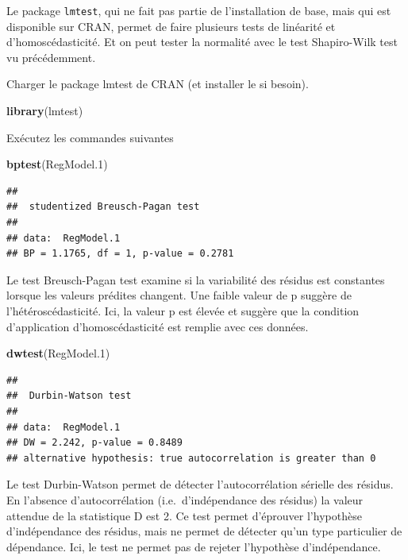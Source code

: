 \documentclass[12pt,]{book}
\makeatletter
\newenvironment{Shaded}{\begin{snugshade}}{\end{snugshade}}
\newcommand{\FloatTok}[1]{\textcolor[rgb]{0.00,0.00,0.81}{#1}}
\newcommand{\KeywordTok}[1]{\textcolor[rgb]{0.13,0.29,0.53}{\textbf{#1}}}
\newcommand{\NormalTok}[1]{#1}
\newenvironment{kframe}{%
\medskip{}
\setlength{\fboxsep}{.8em}
\def\at@end@of@kframe{}%
\ifinner\ifhmode%
 \def\at@end@of@kframe{\end{minipage}}%
 \begin{minipage}{\columnwidth}%
\fi\fi%
\def\FrameCommand##1{\hskip\@totalleftmargin \hskip-\fboxsep
\colorbox{incolor}{##1}\hskip-\fboxsep
    \hskip-\linewidth \hskip-\@totalleftmargin \hskip\columnwidth}%
\MakeFramed {\advance\hsize-\width
  \@totalleftmargin\z@ \linewidth\hsize
  \@setminipage}}%
{\par\unskip\endMakeFramed%
\at@end@of@kframe}
\newenvironment{rmdblock}[1]
 {
 \begin{itemize}
 \renewcommand{\labelitemi}{
   \raisebox{-.7\height}[0pt][0pt]{
     {\setkeys{Gin}{width=3em,keepaspectratio}\texttt{[image: images/\#1]}}
   }
 }
 \begin{kframe}
 \setlength{\fboxsep}{1em}
 \item
 }
 {
 \end{kframe}
 \end{itemize}
 }
\newenvironment{rmdcode}
  {\begin{rmdblock}{screen}}
  {\end{rmdblock}}
\makeatother
\begin{document}
Le package \texttt{lmtest}, qui ne fait pas partie de l'installation de base, mais qui est disponible sur CRAN, permet de faire plusieurs tests de linéarité et d'homoscédasticité. Et on peut tester la normalité avec le test Shapiro-Wilk test vu précédemment.

\begin{rmdcode}
Charger le package lmtest de CRAN (et installer le si besoin).
\end{rmdcode}

\begin{Shaded}
\begin{Highlighting}[]
\KeywordTok{library}\NormalTok{(lmtest)}
\end{Highlighting}
\end{Shaded}

\begin{rmdcode}
Exécutez les commandes suivantes
\end{rmdcode}

\begin{Shaded}
\begin{Highlighting}[]
\KeywordTok{bptest}\NormalTok{(RegModel}\FloatTok{.1}\NormalTok{)}
\end{Highlighting}
\end{Shaded}

\begin{verbatim}
## 
##  studentized Breusch-Pagan test
## 
## data:  RegModel.1
## BP = 1.1765, df = 1, p-value = 0.2781
\end{verbatim}

Le test Breusch-Pagan test examine si la variabilité des résidus est constantes lorsque les valeurs prédites changent. Une faible valeur de p suggère de l'hétéroscédasticité. Ici, la valeur p est élevée et suggère que la condition d'application d'homoscédasticité est remplie avec ces données.

\begin{Shaded}
\begin{Highlighting}[]
\KeywordTok{dwtest}\NormalTok{(RegModel}\FloatTok{.1}\NormalTok{)}
\end{Highlighting}
\end{Shaded}

\begin{verbatim}
## 
##  Durbin-Watson test
## 
## data:  RegModel.1
## DW = 2.242, p-value = 0.8489
## alternative hypothesis: true autocorrelation is greater than 0
\end{verbatim}

Le test Durbin-Watson permet de détecter l'autocorrélation sérielle des résidus. En l'absence d'autocorrélation (i.e.~d'indépendance des résidus) la valeur attendue de la statistique D est 2. Ce test permet d'éprouver l'hypothèse d'indépendance des résidus, mais ne permet de détecter qu'un type particulier de dépendance. Ici, le test ne permet pas de rejeter l'hypothèse d'indépendance.
\end{document}
